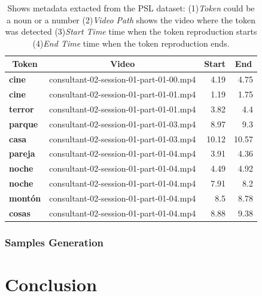\documentclass[twocolumn,conference]{article}
\begin{document}
\begin{table}[!htb]
\captionsetup{font=footnotesize}
\centering
\begin{tabular}{ l p{10em} r r }
\toprule
\multicolumn{1}{c}{\textbf{Token}} & 
	\multicolumn{1}{c}{\textbf{Video}} &
	\multicolumn{1}{c}{\textbf{Start}} &
	\multicolumn{1}{c}{\textbf{End}}\\
\midrule
\textbf{cine}&	consultant-02-session-01-part-01-00.mp4&	4.19&	4.75\\
\textbf{cine}&	consultant-02-session-01-part-01-01.mp4&	1.19&	1.75\\
\textbf{terror}&	consultant-02-session-01-part-01-01.mp4&	3.82&	4.4\\
\textbf{parque}&	consultant-02-session-01-part-01-03.mp4&	8.97&	9.3\\
\textbf{casa}&	consultant-02-session-01-part-01-03.mp4&	10.12&	10.57\\
\textbf{pareja}&	consultant-02-session-01-part-01-04.mp4&	3.91&	4.36\\
\textbf{noche}&	consultant-02-session-01-part-01-04.mp4&	4.49&	4.92\\
\textbf{noche}&	consultant-02-session-01-part-01-04.mp4&	7.91&	8.2\\
\textbf{mont\'on}&	consultant-02-session-01-part-01-04.mp4&	8.5&	8.78\\
\textbf{cosas}&	consultant-02-session-01-part-01-04.mp4&	8.88&	9.38\\
\bottomrule
\end{tabular}
\caption{Shows metadata extacted from the PSL dataset: (1)\textit{Token} could be a noun or a number (2)\textit{Video Path} shows the video where the token was detected (3)\textit{Start Time} time when the token reproduction starts (4)\textit{End Time} time when the token reproduction ends.}
\end{table}

\subsubsection{Samples Generation}\label{samples-generation} 
\section{Conclusion}\label{conclusion}



\end{document}

